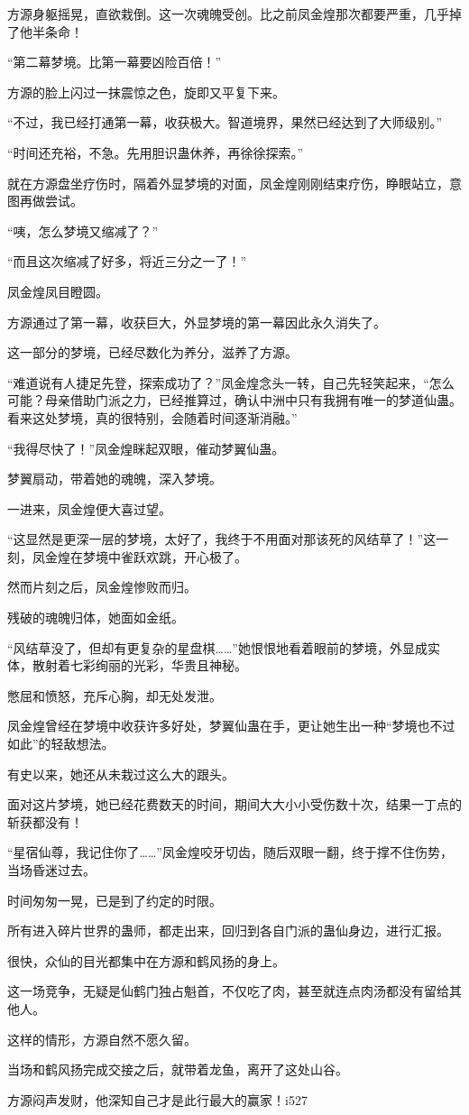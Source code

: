 \begin{this_body}
方源身躯摇晃，直欲栽倒。这一次魂魄受创。比之前凤金煌那次都要严重，几乎掉了他半条命！

“第二幕梦境。比第一幕要凶险百倍！”

方源的脸上闪过一抹震惊之色，旋即又平复下来。

“不过，我已经打通第一幕，收获极大。智道境界，果然已经达到了大师级别。”

“时间还充裕，不急。先用胆识蛊休养，再徐徐探索。”

就在方源盘坐疗伤时，隔着外显梦境的对面，凤金煌刚刚结束疗伤，睁眼站立，意图再做尝试。

“咦，怎么梦境又缩减了？”

“而且这次缩减了好多，将近三分之一了！”

凤金煌凤目瞪圆。

方源通过了第一幕，收获巨大，外显梦境的第一幕因此永久消失了。

这一部分的梦境，已经尽数化为养分，滋养了方源。

“难道说有人捷足先登，探索成功了？”凤金煌念头一转，自己先轻笑起来，“怎么可能？母亲借助门派之力，已经推算过，确认中洲中只有我拥有唯一的梦道仙蛊。看来这处梦境，真的很特别，会随着时间逐渐消融。”

“我得尽快了！”凤金煌眯起双眼，催动梦翼仙蛊。

梦翼扇动，带着她的魂魄，深入梦境。

一进来，凤金煌便大喜过望。

“这显然是更深一层的梦境，太好了，我终于不用面对那该死的风结草了！”这一刻，凤金煌在梦境中雀跃欢跳，开心极了。

然而片刻之后，凤金煌惨败而归。

残破的魂魄归体，她面如金纸。

“风结草没了，但却有更复杂的星盘棋……”她恨恨地看着眼前的梦境，外显成实体，散射着七彩绚丽的光彩，华贵且神秘。

憋屈和愤怒，充斥心胸，却无处发泄。

凤金煌曾经在梦境中收获许多好处，梦翼仙蛊在手，更让她生出一种“梦境也不过如此”的轻敌想法。

有史以来，她还从未栽过这么大的跟头。

面对这片梦境，她已经花费数天的时间，期间大大小小受伤数十次，结果一丁点的斩获都没有！

“星宿仙尊，我记住你了……”凤金煌咬牙切齿，随后双眼一翻，终于撑不住伤势，当场昏迷过去。

时间匆匆一晃，已是到了约定的时限。

所有进入碎片世界的蛊师，都走出来，回归到各自门派的蛊仙身边，进行汇报。

很快，众仙的目光都集中在方源和鹤风扬的身上。

这一场竞争，无疑是仙鹤门独占魁首，不仅吃了肉，甚至就连点肉汤都没有留给其他人。

这样的情形，方源自然不愿久留。

当场和鹤风扬完成交接之后，就带着龙鱼，离开了这处山谷。

方源闷声发财，他深知自己才是此行最大的赢家！i527

\end{this_body}

